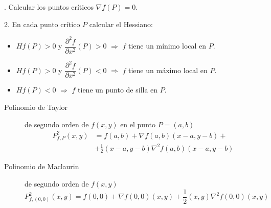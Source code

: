\begin{multicols}{2}
	\begin{tcolorbox}[hbox, title=Extremos locales y puntos de silla]
		\begin{minipage}{0.4\textwidth}
			. Calcular los puntos críticos $\nabla f(P)=0$.

			2. En cada punto crítico $P$ calcular el Hessiano:
				\begin{itemize}
					\item $Hf(P)>0$ y $\dfrac{\partial^2 f}{\partial x^2}(P)>0$ $\Rightarrow$ $f$ tiene un mínimo local en $P$.
					\item $Hf(P)>0$ y $\dfrac{\partial^2 f}{\partial x^2}(P)<0$ $\Rightarrow$ $f$ tiene un máximo local en $P$.					
					\item $Hf(P)<0$ $\Rightarrow$ $f$ tiene un punto de silla en $P$.
					\end{itemize}
		\end{minipage}
	\end{tcolorbox}

	\begin{tcolorbox}[hbox, title=Aproximación de funciones]
		\begin{minipage}{0.4\textwidth}
			\flushleft
			\begin{description}
				\item[Polinomio de Taylor] de segundo orden de $f(x,y)$ en el punto $P=(a,b)$
				\[
					\begin{split}					
					P^2_{f,P}(x,y)&=f(a,b)+\nabla f(a,b)(x-a,y-b)+\\
					&+\frac{1}{2}(x-a,y-b)\nabla^2f(a,b)(x-a,y-b)
					\end{split}
				\]
				\item[Polinomio de Maclaurin] de segundo orden de $f(x,y)$
				\[
					P^2_{f,(0,0)}(x,y)=f(0,0)+\nabla f(0,0)(x,y)+\frac{1}{2}(x,y)\nabla^2f(0,0)(x,y)
				\]
			\end{description}
		\end{minipage}
	\end{tcolorbox}

\end{multicols}

